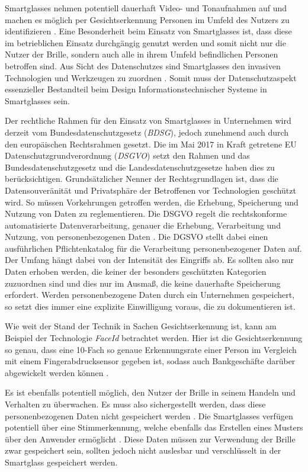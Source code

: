 Smartglasses nehmen potentiell dauerhaft Video- und Tonaufnahmen auf und machen es möglich per Gesichtserkennung Personen im Umfeld des Nutzers zu identifizieren \cite[S.~38f]{Schwenke2016}. Eine Besonderheit beim Einsatz von Smartglasses ist, dass diese im betrieblichen Einsatz durchgängig genutzt werden und somit nicht nur die Nutzer der Brille, sondern auch alle in ihrem Umfeld befindlichen Personen betroffen sind. Aus Sicht des Datenschutzes sind Smartglasses den invasiven Technologien und Werkzeugen zu zuordnen \cite{Berkemeier2017}. Somit muss der Datenschutzaspekt essenzieller Bestandteil beim Design Informationstechnischer Systeme in Smartglasses sein. 

Der rechtliche Rahmen für den Einsatz von Smartglasses in Unternehmen wird derzeit vom Bundesdatenschutzgesetz (\emph{BDSG}), jedoch zunehmend auch durch den europäischen Rechtsrahmen gesetzt. Die im Mai 2017 in Kraft getretene EU Datenschutzgrundverordnung (\emph{DSGVO}) setzt den Rahmen und das Bundesdatenschutzgesetz und die Landesdatenschutzgesetze haben dies zu berücksichtigen. Grundsätzlicher Nenner der Rechtsgrundlagen ist, dass die Datensouveränität und Privatsphäre der Betroffenen vor Technologien geschützt wird. So müssen Vorkehrungen getroffen werden, die Erhebung, Speicherung und Nutzung von Daten zu reglementieren.
Die DSGVO regelt die rechtskonforme automatisierte Datenverarbeitung, genauer die Erhebung, Verarbeitung und Nutzung, von personenbezogenen Daten \cite{Berkemeier2017}. Die DGSVO stellt dabei einen ausführlichen Pflichtenkatalog für die Verarbeitung personenbezogener Daten auf. Der Umfang hängt dabei von der Intensität des Eingriffs ab. Es sollten also nur Daten erhoben werden, die keiner der besonders geschützten Kategorien zuzuordnen sind und dies nur im Ausmaß, die keine dauerhafte Speicherung erfordert. Werden personenbezogene Daten durch ein Unternehmen gespeichert, so setzt dies immer eine explizite Einwilligung voraus, die zu dokumentieren ist.

Wie weit der Stand der Technik in Sachen Gesichtserkennung ist, kann am Beispiel der Technologie \emph{FaceId} betrachtet werden. Hier ist die Gesichtserkennung so genau, dass eine 10-Fach so genaue Erkennungsrate einer Person im Vergleich mit einem Fingerabdrucksensor gegeben ist, sodass auch Bankgeschäfte darüber abgewickelt werden können \cite{Apple2018a}. 

Es ist ebenfalls potentiell möglich, den Nutzer der Brille in seinem Handeln und Verhalten zu überwachen. Es muss also sichergestellt werden, dass diese personenbezogenen Daten nicht gespeichert werden \cite[S.~34]{Schwenke2016}. Die Smartglasses verfügen potentiell über eine Stimmerkennung, welche ebenfalls das Erstellen eines Musters über den Anwender ermöglicht \cite[S.~41]{Schwenke2016}. Diese Daten müssen zur Verwendung der Brille zwar gespeichert sein, sollten jedoch nicht auslesbar und verschlüsselt in der Smartglass gespeichert werden.

